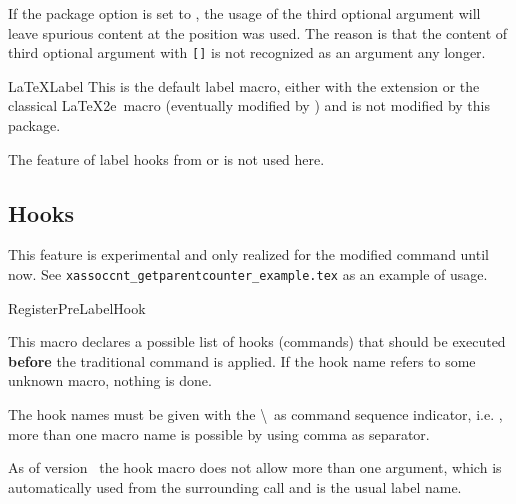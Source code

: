 \documentclass[12pt,a4paper,oneside]{article}
\makeatletter
\newcommand{\chdocextractversion}[1]{%
  \@nameuse{#1}%
}
\newcommand{\CHDocNew}[1]{%
  \tcbdocmarginnote[doclang/new={N},
  colframe=blue,
  halign=left,
  colback={blue!20!white},
  fontupper={\tiny}
  ]{%
    \chdocextractversion{xassoccntversion#1}%
  }%
}
\def\packageversion{\xassoccntpackageversion}%
\makeatother
\begin{document}
\begin{marker}
\marginnote{\bcbombe}
If the package option  is set to , the usage of the third optional argument will leave spurious content at the position  was used. The reason is that the content of third optional argument with \texttt{[]} is not recognized as an argument any longer. 
\end{marker}


\begin{docCommand}[before={\CHDocNew{1.3}}]{LaTeXLabel}{}
  This is the default label macro, either with the  extension or the classical \LaTeX2e\ macro (eventually modified by ) and is not modified by this package. 


The feature of label hooks from  or  is not used here. 
\end{docCommand}


\subsection{Hooks}


This feature is experimental and only realized for the modified  command until now. See \nolinkurl{xassoccnt_getparentcounter_example.tex} as an example of usage. 

\begin{docCommand}[before={\CHDocNew{1.3}}]{RegisterPreLabelHook}{}

This macro declares a possible list of hooks (commands) that should be executed \textbf{before} the traditional  command is applied. If the hook name refers to some unknown macro, nothing is done. 

The hook names must be given with the \textbackslash\ as command sequence indicator, i.e. , more than one macro name is possible by using comma as separator. 

As of version \packageversion\ the hook macro does not allow more than one argument, which is automatically used from the surrounding  call and is the usual label name. 


\end{docCommand}
\end{document}
